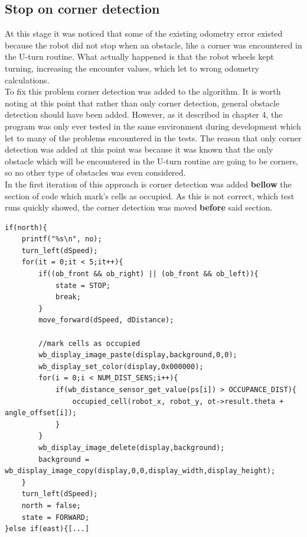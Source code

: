 \subsection{Stop on corner detection}
At this stage it was noticed that some of the existing odometry error existed because the robot did not stop when an obstacle, like a corner was encountered in the U-turn routine. 
What actually happened is that the robot wheels kept turning, increasing the encounter values, which let to wrong odometry calculations. \\
To fix this problem corner detection was added to the algorithm. 
It is worth noting at this point that rather than only corner detection, general obstacle detection should have been added. However, as it described in chapter 4, the program was only ever tested in the same environment during development which let to many of the problems encountered in the tests. 
The reason that only corner detection was added at this point was because it was known that the only obstacle which will be encountered in the U-turn routine are going to be corners, so no other type of obstacles was even considered.\\[3ex]

In the first iteration of this approach is corner detection was added \textbf{bellow} the section of code which mark's cells as occupied.
 As this is not correct, which test runs quickly showed, the corner detection was moved \textbf{before} said section. \\

\begin{lstlisting}[caption={Corner detection added to the U-turn routine}, label={corner-uturn}]
if(north){
	printf("%s\n", no);
	turn_left(dSpeed);
	for(it = 0;it < 5;it++){
		if((ob_front && ob_right) || (ob_front && ob_left)){
			state = STOP;
			break;
		}
		move_forward(dSpeed, dDistance);

		//mark cells as occupied
		wb_display_image_paste(display,background,0,0);
		wb_display_set_color(display,0x000000);
		for(i = 0;i < NUM_DIST_SENS;i++){
			if(wb_distance_sensor_get_value(ps[i]) > OCCUPANCE_DIST){
				occupied_cell(robot_x, robot_y, ot->result.theta + angle_offset[i]);
			}
		}
		wb_display_image_delete(display,background);
		background = wb_display_image_copy(display,0,0,display_width,display_height); 
	}
	turn_left(dSpeed);
	north = false;
	state = FORWARD;
}else if(east){[...]
\end{lstlisting}



 




